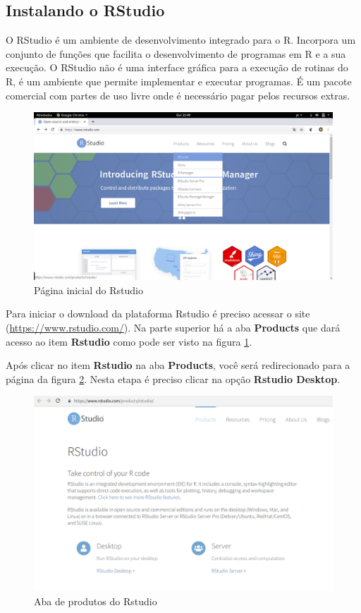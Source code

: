 \documentclass[12pt,a4paper,oneside]{erdc}
\begin{document}
\subsection{Instalando o RStudio}

O RStudio é um ambiente de desenvolvimento integrado para o R. Incorpora um conjunto de funções que facilita o desenvolvimento de programas em R e a sua execução. O RStudio não é uma interface gráfica para a execução de rotinas do R, é um ambiente que permite implementar e executar programas. É um pacote comercial com partes de uso livre onde é necessário pagar pelos recursos extras.

\begin{figure}[htpb]
	\centering
	\includegraphics[width=\linewidth]{../figs/BP_Curso_TecComp_00_2019_f01-05}
	\caption{Página inicial do Rstudio}
	\label{fig:f01-05}
\end{figure}

Para iniciar o download da plataforma Rstudio é preciso acessar o site (\url{https://www.rstudio.com/}). Na parte superior há a aba \textbf{Products} que dará acesso ao item \textbf{Rstudio} como pode ser visto na figura \ref{fig:f01-05}. 

Após clicar no item \textbf{Rstudio} na aba \textbf{Products}, você será redirecionado para a página da figura \ref{fig:f01-06}. Nesta etapa é preciso clicar na opção \textbf{Rstudio Desktop}.

\newpage

\begin{figure}[htpb!]
	\centering
	\includegraphics[width=\linewidth]{../figs/BP_Curso_TecComp_00_2019_f01-06}
	\caption{Aba de produtos do Rstudio}
	\label{fig:f01-06}
\end{figure}
\end{document}
